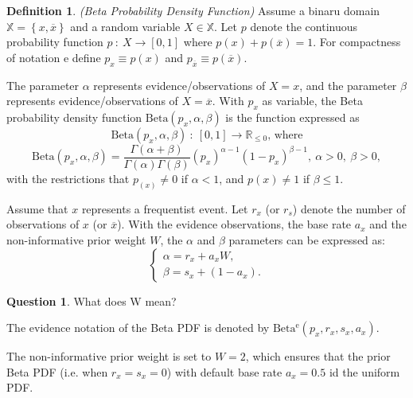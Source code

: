 \documentclass[a4paper,12pt]{article}
\theoremstyle{definition}
\newtheorem{question}{Question}[section]
\newtheorem{definition}{Definition}[section]
\numberwithin{equation}{section}
\begin{document}
\begin{definition}
	\emph{(Beta Probability Density Function)} Assume a binaru domain $\mathbb{X} = \left\{x,\overline{x}\right\}$ and a random variable $X \in \mathbb{X}$. Let $p$ denote the continuous probability function $p\ :\ X \rightarrow \left[0,1\right]$ where $p(x) + p(\overline{x}) = 1$. For compactness of notation e define $p_x \equiv p\left(x\right)$ and $p_{\overline{x}} \equiv p\left(\overline{x}\right)$.
	
	The parameter $\alpha$ represents evidence/observations of $X = x$, and the parameter $\beta$ represents evidence/observations of $X = \overline{x}$. With $p_x$ as variable, the Beta probability density function $\mathrm{Beta}(p_x, \alpha, \beta)$ is the function expressed as
	\begin{equation}
		\mathrm{Beta}(p_x, \alpha, \beta)\ :\ [0, 1] \rightarrow \mathbb{R}_{\leq0}\text{, where}
	\end{equation}
	\begin{equation}
		\mathrm{Beta}(p_x, \alpha, \beta) = \dfrac{\Gamma(\alpha + \beta)}{\Gamma(\alpha)\Gamma(\beta)}(p_x)^{\alpha - 1}(1 - p_x)^{\beta - 1},\ \alpha > 0,\ \beta > 0,
	\end{equation}
	with the restrictions that $p_(x) \neq 0$ if $\alpha < 1$, and $p(x) \neq 1$ if $\beta \leq 1$.
\end{definition}

Assume that $x$ represents a frequentist event. Let $r_x$ (or $r_s$) denote the number of observations of $x$ (or $\overline{x}$). With the evidence observations, the base rate $a_x$ and the non-informative prior weight $W$, the $\alpha$ and $\beta$ parameters can be expressed as:
\begin{equation}
	\begin{cases}
		\alpha = r_x + a_x W\text{,} \\
		\beta = s_x + (1 - a_x)\text{.}
	\end{cases}
\end{equation}

\begin{question}
	What does W mean? 
\end{question}

The evidence notation of the Beta PDF is denoted by $\mathrm{Beta^e}(p_x, r_x, s_x, a_x)$.

The non-informative prior weight is set to $W = 2$, which ensures that the prior Beta PDF (i.e. when $r_x = s_x = 0$) with default base rate $a_x = 0.5$ id the uniform PDF.
\end{document}

